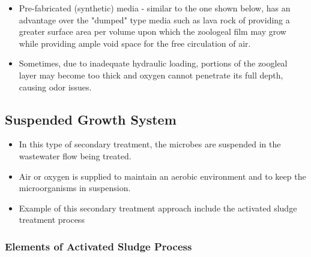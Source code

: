 \documentclass{article}
\begin{document}
\begin{itemize}
\item Pre-fabricated (synthetic) media - similar to the one shown below, has an advantage over the "dumped" type media such as lava rock of providing a greater surface area per volume upon which the zoologeal film may grow while providing ample void space for the free circulation of air.

\item Sometimes, due to inadequate hydraulic loading, portions of the zoogleal layer may become too thick and oxygen cannot penetrate its full depth, causing odor issues.





\end{itemize}



\subsection{Suspended Growth System}
\begin{itemize}
\item In this type of secondary treatment, the microbes are suspended in the
wastewater flow being treated. 
\item Air or oxygen is supplied to maintain an aerobic environment and to keep the microorganisms in suspension. 
\item Example of this secondary treatment approach include the activated sludge treatment process 
\end{itemize}

\subsubsection{Elements of Activated Sludge Process}
\end{document}
